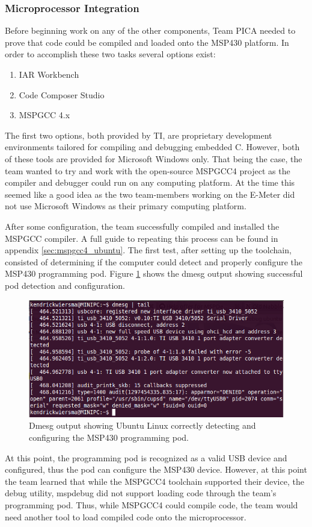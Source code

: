 \subsubsection{Microprocessor Integration}
Before beginning work on any of the other components, Team PICA needed to prove that code could be compiled and loaded onto the MSP430 platform. In order to accomplish these two tasks several options exist:
\begin{enumerate}
\item IAR Workbench
\item Code Composer Studio
\item MSPGCC 4.x
\end{enumerate}
The first two options, both provided by \ac{TI}, are proprietary development environments tailored for compiling and debugging embedded C. However, both of these tools are provided for Microsoft Windows only. That being the case, the team wanted to try and work with the open-source MSPGCC4 project as the compiler and debugger could run on any computing platform. At the time this seemed like a good idea as the two team-members working on the E-Meter did not use Microsoft Windows as their primary computing platform.

After some configuration, the team successfully compiled and installed the MSPGCC compiler. A full guide to repeating this process can be found in appendix \ref{sec:mspgcc4_ubuntu}. The first test, after setting up the toolchain, consisted of determining if the computer could detect and properly configure the MSP430 programming pod. Figure \ref{fig:msp430_programming_pod_detection} shows the dmesg output showing successful pod detection and configuration.
\begin{figure}[htbp]
\begin{center}
\includegraphics[width=5in]{includes/MSPGCC_Detect_Pod}
\caption{Dmesg output showing Ubuntu Linux correctly detecting and configuring the MSP430 programming pod.}
\label{fig:msp430_programming_pod_detection}                                            
\end{center}
\end{figure}
At this point, the programming pod is recognized as a valid USB device and configured, thus the pod can configure the MSP430 device. However, at this point the team learned that while the MSPGCC4 toolchain supported their device, the debug utility, mspdebug did not support loading code through the team's programming pod. Thus, while MSPGCC4 could compile code, the team would need another tool to load compiled code onto the microprocessor.

